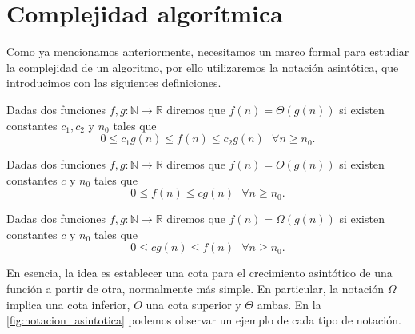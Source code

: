 
\chapter{Complejidad algorítmica}\label{ch:cuarto-capitulo}

Como ya mencionamos anteriormente, necesitamos un marco formal para estudiar la complejidad de un algoritmo, por ello utilizaremos la notación asintótica, que introducimos con las siguientes definiciones.

\begin{definicion}
	Dadas dos funciones $f,g:\mathbb{N}\rightarrow \mathbb{R}$ diremos que $f(n)=\Theta(g(n))$ si existen constantes $c_1,c_2$ y $n_0$ tales que $$0\leq c_1g(n)\leq f(n)\leq c_2g(n)\ \ \ \forall n\geq n_0.$$
\end{definicion}

\begin{definicion}
	Dadas dos funciones $f,g:\mathbb{N}\rightarrow \mathbb{R}$ diremos que $f(n)=O(g(n))$ si existen constantes $c$ y $n_0$ tales que $$0\leq f(n)\leq cg(n)\ \ \ \forall n\geq n_0.$$
\end{definicion}

\begin{definicion}
	Dadas dos funciones $f,g:\mathbb{N}\rightarrow \mathbb{R}$ diremos que $f(n)=\Omega(g(n))$ si existen constantes $c$ y $n_0$ tales que $$0\leq cg(n)\leq f(n)\ \ \ \forall n\geq n_0.$$
\end{definicion}

En esencia, la idea es establecer una cota para el crecimiento asintótico de una función a partir de otra, normalmente más simple. En particular, la notación $\Omega$ implica una cota inferior, $O$ una cota superior y $\Theta$ ambas. En la \autoref{fig:notacion_asintotica} podemos observar un ejemplo de cada tipo de notación. \\

